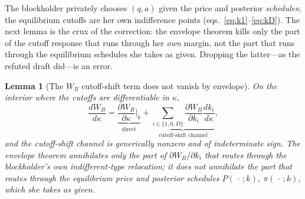 \documentclass[11pt]{article}
\newtheorem{lemma}{Lemma}
\newcommand{\1}{\mathbf{1}}
\begin{document}
The blockholder privately chooses $(q,a)$ given the price and posterior
\emph{schedules}; the equilibrium cutoffs are her own indifference points
(eqs.~\eqref{eq:k1}--\eqref{eq:kD}). The next lemma is the crux of the
correction: the envelope theorem kills only the part of the cutoff response that
runs through her \emph{own} margin, not the part that runs through the
equilibrium schedules she takes as given. Dropping the latter---as the refuted
draft did---is an error.

\begin{lemma}[The $W_B$ cutoff-shift term does not vanish by envelope]
\label{lem:no-env-WB}
On the interior where the cutoffs are differentiable in $\kappa$,
\begin{equation}
\frac{dW_B}{d\kappa}
 =\underbrace{\frac{\partial W_B}{\partial\kappa}\bigg|_{k}}_{\text{direct}}
 +\underbrace{\sum_{i\in\{1,0,D\}}\frac{\partial W_B}{\partial k_i}
     \frac{dk_i}{d\kappa}}_{\text{cutoff-shift channel}},
\label{eq:tot-deriv-WB}
\end{equation}
and the cutoff-shift channel is generically nonzero and of indeterminate sign.
The envelope theorem annihilates only the part of $\partial W_B/\partial k_i$
that routes through the blockholder's \emph{own} indifferent-type relocation; it
does \emph{not} annihilate the part that routes through the equilibrium price and
posterior schedules $P(\,\cdot\,;k)$, $\pi(\,\cdot\,;k)$, which she takes as given.
\end{lemma}
\end{document}
